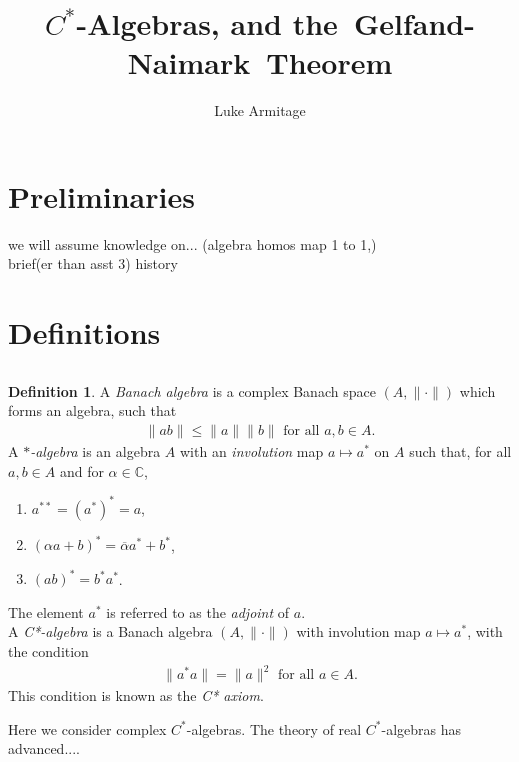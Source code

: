 \documentclass[12pt,a4paper]{amsart}
\author{Luke Armitage}
\title{$C^\ast$-Algebras, and the~Gelfand-Naimark~Theorem}
\theoremstyle{plain}
\theoremstyle{definition}
\newtheorem{defn}{Definition}
\newcommand{\1}{\mathbbm{1}}
\newcommand{\C}{\mathbb{C}}
\begin{document}
\maketitle
\makeatletter  %
    \providecommand\@dotsep{5}
  \makeatother
\listoftodos\relax

\section{Preliminaries}
we will assume knowledge on... (algebra homos map 1 to 1,)\\
brief(er than asst 3) history



\section{Definitions}

\subsection*{}
\begin{defn}
	A \emph{Banach algebra} is a complex Banach space $(A,\|\cdot\|)$ which forms an 
	algebra, such that 
	\begin{align*}
		\|ab\| \leq \|a\| \|b\| \mbox{ for all } a,b \in A.
	\end{align*}
	A \emph{$\ast$-algebra} is an algebra $A$ with an \emph{involution} map 
	$a \mapsto a^\ast$ on $A$ such that, for all $a,b \in A$ and for $\alpha \in \C$,
	\renewcommand{\labelenumi}{(\roman{enumi})}
	\begin{enumerate}
		\item $a^{\ast\ast} = (a^\ast)^\ast = a$,
		\item $(\alpha a+b)^\ast = \overline{\alpha} a^\ast + b^\ast$,
		\item $(ab)^\ast = b^\ast a^\ast$.
	\end{enumerate}
	The element $a^\ast$ is referred to as the \emph{adjoint} of $a$. 		\\
	A \emph{C*-algebra} is a Banach algebra $(A, \| \cdot \|)$ with involution 
	map $a \mapsto a^\ast$, with the condition
	\begin{align*}
		\|a ^\ast a\| = \|a\|^2 \mbox{ for all } a \in A.
	\end{align*}
	This condition is known as the \emph{C* axiom}. 
\end{defn}
Here we consider complex $C^\ast$-algebras. The theory of real $C^\ast$-algebras has advanced....
\end{document}
